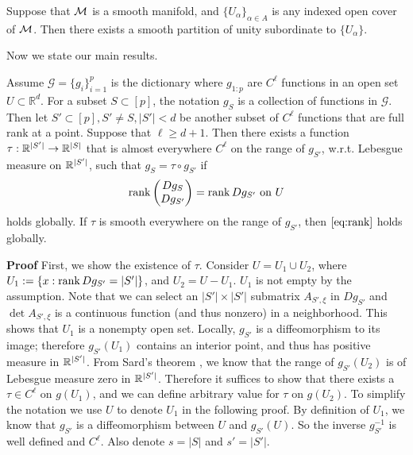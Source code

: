 \begin{lemma}
Suppose that ${\cal M}$ is a smooth manifold, and $\{U_\alpha\}_{\alpha\in A}$ is any indexed open cover of ${\cal M}$. Then there exists a {smooth} partition of unity subordinate to $\{U_\alpha\}$.
\label{lem:partition}
\end{lemma}

Now we state our main results.
\begin{theorem}\label{thm:uni} Assume $\mathcal{G}=\{g_i\}_{i=1}^p$ is the dictionary where $g_{1:p}$ are $C^\ell$ functions in an open set $U \subset \mathbb{R}^d$. For a subset $S\subset[p]$, the notation $g_S$ is a collection of functions in $\mathcal{G}$.  Then let $S'\subset [p],S'\neq S,|S'| < d$ be another subset of $C^\ell$ functions that are full rank at a point.  Suppose that $\ell\geq d+1$. Then there exists a function $\tau:{\mathbb R}^{|S'|}\rightarrow {\mathbb R}^{|S|}$ that is almost everywhere $C^\ell$ on the range of $g_{S'}$, w.r.t. Lebesgue measure on ${\mathbb R}^{|S'|}$, such that $g_S = \tau \circ g_{S'}$ if
\begin{equation} \label{eq:rank}
	\operatorname{rank}\begin{pmatrix} D{g_S} \\ D{g_{S'}} \end{pmatrix} = \operatorname{rank} D{g_{S'}} \ \text{on} \ U
\end{equation}
holds globally. If  $\tau$ is smooth everywhere on the range of $g_{S'}$, then $\eqref{eq:rank}$ holds globally.
\end{theorem}
{\bf Proof} 
First, we show the existence of $\tau$.
Consider $U=U_1\cup U_2$, where $U_1:=\{x: \operatorname{rank} Dg_{S'} = |S'|\}$, and $U_2 = U-U_1$.  $U_1$ is not empty by the assumption. Note that we can select an $|S'|\times |S'|$ submatrix $A_{S',\xi}$ in $Dg_{S'}$ and $\det A_{S',\xi}$ is a continuous function (and thus nonzero) in a neighborhood. This shows that $U_1$ is a nonempty open set. Locally, $g_{S'}$ is a diffeomorphism to its image; therefore $g_{S'}(U_1)$ contains an interior point, and thus has positive measure in ${\mathbb R}^{|S'|}$. From Sard's theorem \citep{smoothmfd}, we know that the range of $g_{S'}(U_2)$ is of Lebesgue measure zero in ${\mathbb R}^{|S'|}$. Therefore it suffices to show that there exists a $\tau\in C^\ell$ on $g(U_1)$, and we can define arbitrary value for $\tau$ on $g(U_2)$. To simplify the notation we use $U$ to denote $U_1$ in the following proof. By definition of $U_1$, we know that $g_{S'}$ is a diffeomorphism between $U$ and $g_{S'}(U)$. So the inverse $g_{S'}^{-1}$ is well defined and $C^\ell$. Also denote $s=|S|$ and $s'=|S'|$.
